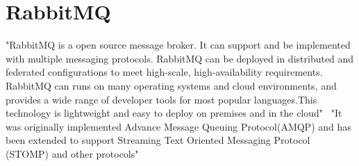 \section{RabbitMQ}

"RabbitMQ is a open source message broker. It can support and be implemented with 
multiple messaging protocols. RabbitMQ can be deployed in distributed and federated 
configurations to meet high-scale, high-availability requirements. RabbitMQ can runs
on many operating systems and cloud environments, and provides a wide range of developer
tools for most popular languages.This technology is lightweight and easy to deploy on
premises and in the cloud"~\cite{RabbitMQ}
"It was originally implemented Advance Message Queuing Protocol(AMQP) and has been extended to 
support Streaming Text Oriented Messaging Protocol (STOMP) and other protocols"~\cite{RabbitMQ-wiki}